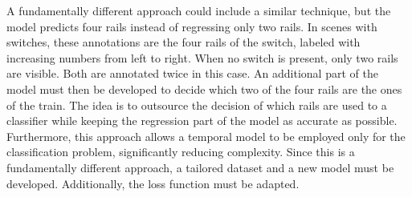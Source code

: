 A fundamentally different approach could include a similar technique, but the model predicts four rails instead of regressing only two rails.
In scenes with switches, these annotations are the four rails of the switch, labeled with increasing numbers from left to right.
When no switch is present, only two rails are visible.
Both are annotated twice in this case.
An additional part of the model must then be developed to decide which two of the four rails are the ones of the train.
The idea is to outsource the decision of which rails are used to a classifier while keeping the regression part of the model as accurate as possible.
Furthermore, this approach allows a temporal model to be employed only for the classification problem, significantly reducing complexity.
Since this is a fundamentally different approach, a tailored dataset and a new model must be developed.
Additionally, the loss function must be adapted.
